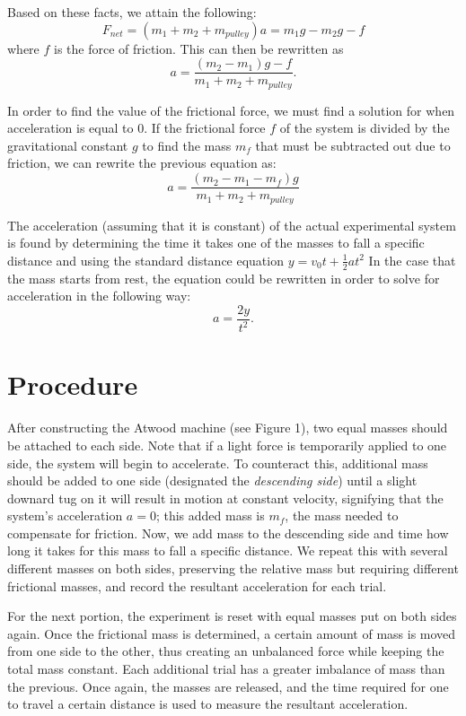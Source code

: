 \documentclass[11pt, titlepage]{article}
\begin{document}
Based on these facts, we attain the following: $$F_{net} = (m_1 + m_2 + m_{pulley})a = m_1g - m_2g - f$$where $f$ is the force of friction. This can then be rewritten as $$a = \frac{(m_2 - m_1)g - f}{m_1 + m_2 + m_{pulley}}.$$ 

In order to find the value of the frictional force, we must find a solution for when acceleration is equal to 0. If the frictional force $f$ of the system is divided by the gravitational constant $g$ to find the mass $m_f$ that must be subtracted out due to friction, we can rewrite the previous equation as: $$a = \frac{(m_2 - m_1 - m_f)g}{m_1 + m_2 + m_{pulley}}$$

The acceleration (assuming that it is constant) of the actual experimental system is found by determining the time it takes one of the masses to fall a specific distance and using the standard distance equation $y = v_0t + \frac{1}{2}at^2$ In the case that the mass starts from rest, the equation could be rewritten in order to solve for acceleration in the following way: $$a = \frac{2y}{t^2}.$$

\section*{Procedure}
After constructing the Atwood machine (see Figure 1), two equal masses should be attached to each side. Note that if a light force is temporarily applied to one side, the system will begin to accelerate. To counteract this, additional mass should be added to one side (designated the \emph{descending side}) until a slight downard tug on it will result in motion at constant velocity, signifying that the system's acceleration $a=0$; this added mass is $m_f$, the mass needed to compensate for friction. Now, we add mass to the descending side and time how long it takes for this mass to fall a specific distance. We repeat this with several different masses on both sides, preserving the relative mass but requiring different frictional masses, and record the resultant acceleration for each trial.

For the next portion, the experiment is reset with equal masses put on both sides again. Once the frictional mass is determined, a certain amount of mass is moved from one side to the other, thus creating an unbalanced force while keeping the total mass constant. Each additional trial has a greater imbalance of mass than the previous. Once again, the masses are released, and the time required for one to travel a certain distance is used to measure the resultant acceleration.
\end{document}
